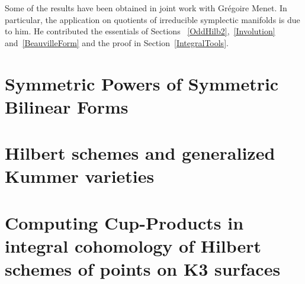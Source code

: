 \documentclass[11pt,twoside]{article}
\newcommand{\chapter}[1]{}
\begin{document}
Some of the results have been obtained in joint work with Gr\'egoire Menet. In particular, the application on quotients of irreducible symplectic manifolds is due to him.
He contributed the essentials of Sections~ \ref{OddHilb2},~\ref{Involution} and~\ref{BeauvilleForm} and the proof in Section~\ref{IntegralTools}.


\cleardoublepage

\tableofcontents

\cleardoublepage


\pagestyle{fancy}




\newpage
\part{Symmetric Powers of Symmetric Bilinear Forms}

\newpage
\part{Hilbert schemes and generalized Kummer varieties}
\chapter{Cohomology of Hilbert schemes of points on surfaces}






\label{integralcohomology}
\chapter{Cohomology of generalized Kummer manifolds}




\chapter{A quotient of the generalized Kummer fourfold}

\newpage
\part{Computing Cup-Products in integral cohomology of Hilbert schemes of points on K3 surfaces}
\end{document}
